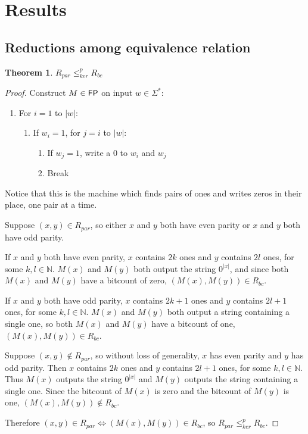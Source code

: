 \documentclass{article}
\newtheorem{theorem}{Theorem}[section]
\theoremstyle{definition}
\newcommand{\sigmastar}{\Sigma^{*}}
\newcommand{\kr}{\leq^{p}_{ker}}
\begin{document}
\section{Results}
\subsection{Reductions among equivalence relation}
\begin{theorem}$R_{par}\kr R_{bc}$\end{theorem}
\begin{proof}
  Construct $M\in {\ensuremath{\mathsf{FP}}}$ on input $w\in\sigmastar$:
  \begin{enumerate}
  \item For $i=1$ to $|w|$:
    \begin{enumerate}
    \item If $w_i = 1$, for $j=i$ to $|w|$:
      \begin{enumerate}
      \item If $w_j = 1$, write a $0$ to $w_i$ and $w_j$
      \item Break
      \end{enumerate}
    \end{enumerate}
  \end{enumerate}
  Notice that this is the machine which finds pairs of ones and writes zeros in
  their place, one pair at a time.

  Suppose $(x,y)\in R_{par}$, so either $x$ and $y$ both have even parity or
  $x$ and $y$ both have odd parity.
  
  If $x$ and $y$ both have even parity, $x$ contains $2k$ ones and $y$ contains
  $2l$ ones, for some $k,l\in\mathbb{N}$. $M(x)$ and $M(y)$ both output the
  string $0^{|x|}$, and since both $M(x)$ and $M(y)$ have a bitcount of zero,
  $(M(x), M(y))\in R_{bc}$.

  If $x$ and $y$ both have odd parity, $x$ contains $2k+1$ ones and $y$
  contains $2l+1$ ones, for some $k,l\in\mathbb{N}$. $M(x)$ and $M(y)$ both
  output a string containing a single one, so both $M(x)$ and $M(y)$ have a
  bitcount of one, $(M(x), M(y))\in R_{bc}$.

  Suppose $(x,y)\notin R_{par}$, so without loss of generality, $x$ has even
  parity and $y$ has odd parity. Then $x$ contains $2k$ ones and $y$ contains
  $2l+1$ ones, for some $k,l\in\mathbb{N}$. Thus $M(x)$ outputs the string
  $0^{|x|}$ and $M(y)$ outputs the string containing a single one. Since the
  bitcount of $M(x)$ is zero and the bitcount of $M(y)$ is one,
  $(M(x),M(y))\notin R_{bc}$.

  Therefore $(x,y)\in R_{par} \iff (M(x),M(y))\in R_{bc}$, so
  $R_{par} \kr R_{bc}$.
\end{proof}
\end{document}
